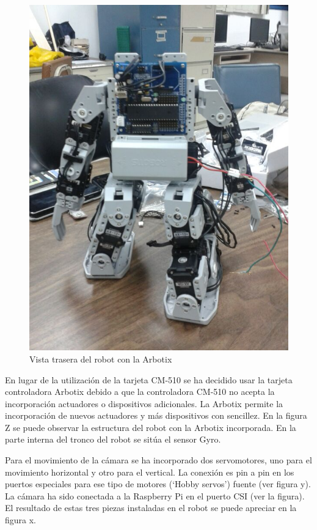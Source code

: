 \begin{figure}[hbtp]
\centering
\includegraphics[scale=0.3]{imagenes/traseroDeJunny.jpg}
\caption{Vista trasera del robot con la Arbotix}
\end{figure}


En lugar de la utilización de la tarjeta CM-510 se ha decidido usar la tarjeta controladora Arbotix debido a que la controladora CM-510 no acepta la incorporación actuadores o dispositivos adicionales. La Arbotix permite la incorporación de nuevos actuadores y más dispositivos con sencillez. En la figura Z se puede observar la estructura del robot con la Arbotix incorporada. En la parte interna del tronco del robot se sitúa el sensor Gyro.



Para el movimiento de la cámara se ha incorporado dos servomotores, uno para el movimiento horizontal y otro para el vertical. La conexión es pin a pin en los puertos especiales para ese tipo de motores (‘Hobby servos’) fuente (ver figura y). La cámara ha sido conectada a la Raspberry Pi en el puerto CSI (ver la figura). El resultado de estas tres piezas instaladas en el robot se puede apreciar en la figura x.


